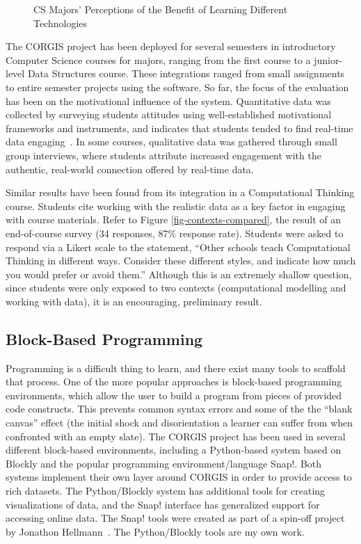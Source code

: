 \begin{figure}
		\begin{center}
		\end{center}
		\caption{CS Majors' Perceptions of the Benefit of Learning Different Technologies}
		\label{fig-expected-benefit}
\end{figure}

The CORGIS project has been deployed for several semesters in introductory Computer Science courses for majors, ranging from the first course to a junior-level Data Structures course.
These integrations ranged from small assignments to entire semester projects using the software.
So far, the focus of the evaluation has been on the motivational influence of the system.
Quantitative data was collected by surveying students attitudes using well-established motivational frameworks and instruments, and indicates that students tended to find real-time data engaging~\cite{realtimeweb}.
In some courses, qualitative data was gathered through small group interviews, where students attribute increased engagement with the authentic, real-world connection offered by real-time data.

Similar results have been found from its integration in a Computational Thinking course. Students cite working with the realistic data as a key factor in engaging with course materials.
Refer to Figure \ref{fig-contexts-compared}, the result of an end-of-course survey (34 responses, 87\% response rate).
Students were asked to respond via a Likert scale to the statement, ``Other schools teach Computational Thinking in different ways. Consider these different styles, and indicate how much you would prefer or avoid them.''
Although this is an extremely shallow question, since students were only exposed to two contexts (computational modelling and working with data), it is an encouraging, preliminary result.

\subsection{Block-Based Programming}

Programming is a difficult thing to learn, and there exist many tools to scaffold that process.
One of the more popular approaches is block-based programming environments, which allow the user to build a program from pieces of provided code constructs.
This prevents common syntax errors and some of the the ``blank canvas'' effect (the initial shock and disorientation a learner can suffer from when confronted with an empty slate).
The CORGIS project has been used in several different block-based environments, including a Python-based system based on Blockly and the popular programming environment/language Snap!. 
Both systems implement their own layer around CORGIS in order to provide access to rich datasets.
The Python/Blockly system has additional tools for creating visualizations of data, and the Snap! interface has generalized support for accessing online data.
The Snap! tools were created as part of a spin-off project by Jonathon Hellmann~\cite{hellmann2015datasnap}. The Python/Blockly tools are my own work.

